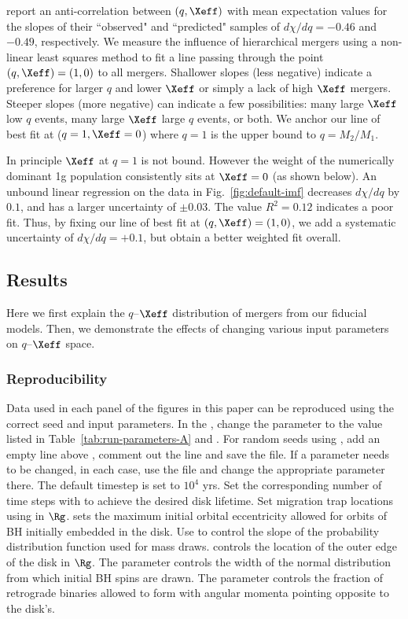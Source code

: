 \citet{Callister+21} report an anti-correlation between $(q,\Xeff)$ with mean expectation values for the slopes of their ``observed" and ``predicted" samples of $d\chi/dq = -0.46$ and $-0.49$, respectively.
We measure the influence of hierarchical mergers using a non-linear least squares method to fit a line passing through the point $(q,\Xeff)=(1,0)$ to all mergers.
Shallower slopes (less negative) indicate a preference for larger $q$ and lower $\Xeff$ or simply a lack of high $\Xeff$ mergers.
Steeper slopes (more negative) can indicate a few possibilities: many large $\Xeff$ low $q$ events, many large $\Xeff$ large $q$ events, or both.
We anchor our line of best fit at ($q=1,\Xeff=0$) where $q=1$ is the upper bound to $q=M_{2}/M_{1}$.

In principle $\Xeff$ at $q=1$ is not bound.
However the weight of the numerically dominant 1g population consistently sits at $\Xeff=0$ (as shown below).
An unbound linear regression on the data in Fig.~\ref{fig:default-imf} decreases $d\chi/dq$ by $0.1$, and has a larger uncertainty of $\pm0.03$.
The value $R^2=0.12$ indicates a poor fit.
Thus, by fixing our line of best fit at $(q,\Xeff)=(1,0)$, we add a systematic uncertainty of $d\chi/dq=+0.1$, but obtain a better weighted fit overall.


\subsection{Results}
\label{sec:results-ch2}
Here we first explain the $q$--$\Xeff$ distribution of mergers from our fiducial models.
Then, we demonstrate the effects of changing various input parameters on $q$--$\Xeff$ space.

\subsubsection{Reproducibility}
Data used in each panel of the figures in this paper can be reproduced using the correct seed and input parameters.
In the , change the  parameter to the value listed in Table~\ref{tab:run-parameters-A} and .
For random seeds using , add an empty line above , comment out the  line and save the file.
If a parameter needs to be changed, in each case, use the  file and change the appropriate parameter there.
The default timestep is set to $10^4$ yrs.
Set the corresponding number of time steps with  to achieve the desired disk lifetime.
Set migration trap locations using  in $\Rg$.
 sets the maximum initial orbital eccentricity allowed for orbits of BH initially embedded in the disk.
Use  to control the slope of the probability distribution function used for mass draws.
 controls the location of the outer edge of the disk in $\Rg$.
The parameter  controls the width of the normal distribution from which initial BH spins are drawn.
The parameter  controls the fraction of retrograde binaries allowed to form with angular momenta pointing opposite to the disk's.

